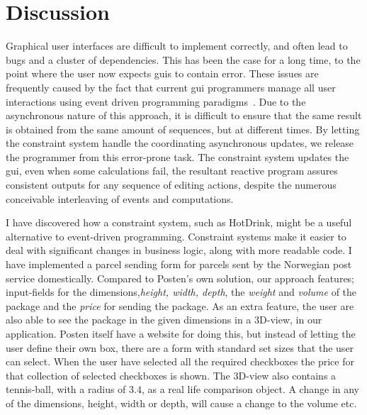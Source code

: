 \chapter{Discussion}
\label{chap:discussion}

Graphical user interfaces are difficult to implement correctly, and often lead to bugs and a cluster of dependencies. This has been the case for a long time, to the point where the user now expects \gls{gui}s to contain error. These issues are frequently caused by the fact that current \gls{gui} programmers manage all user interactions using event driven programming paradigms~\cite{HotDrink}. Due to the asynchronous nature of this approach, it is difficult to ensure that the same result is obtained from the same amount of sequences, but at different times. By letting the constraint system handle the coordinating asynchronous updates, we release the programmer from this error-prone task. The constraint system updates the \gls{gui}, even when some calculations fail, the resultant reactive program assures consistent outputs for any sequence of editing actions, despite the numerous conceivable interleaving of events and computations.

I have discovered how a constraint system, such as HotDrink, might be a useful alternative to event-driven programming. Constraint systems make it easier to deal with significant changes in business logic, along with more readable code. I have implemented a parcel sending form for parcels sent by the Norwegian post service domestically. Compared to Posten's own solution, our approach features; input-fields for the dimensions,\textit{height, width, depth}, the \textit{weight} and \textit{volume} of the package and the \textit{price} for sending the package. As an extra feature, the user are also able to see the package in the given dimensions in a 3D-view, in our application. Posten itself have a website for doing this, but instead of letting the user define their own box, there are a form with standard set sizes that the user can select. When the user have selected all the required checkboxes the price for that collection of selected checkboxes is shown. The 3D-view also contains a tennis-ball, with a radius of $3.4$, as a real life comparison object. A change in any of the dimensions, height, width or depth, will cause a change to the volume etc. 

